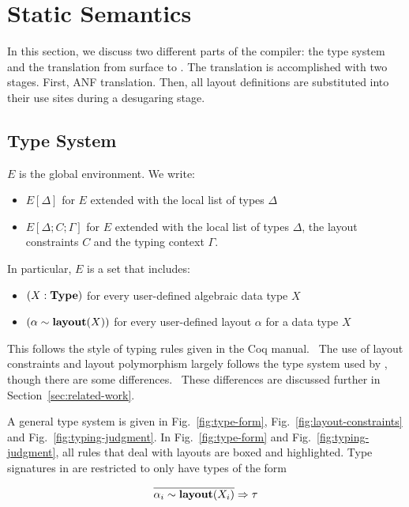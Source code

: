 \section{Static Semantics}

In this section, we discuss two different parts of the \Pika{} compiler: the type system and the translation
from surface \Pika{} to \PikaCore. The translation is accomplished with two stages. First, ANF translation. Then,
all layout definitions are substituted into their use sites during a desugaring stage.

\subsection{\Pika{} Type System}

$E$ is the global environment. We write:

\begin{itemize}
  \item $E[\Delta]$ for $E$ extended with the local list of types $\Delta$
  \item $E[\Delta;C;\Gamma]$ for $E$ extended with the local list of types $\Delta$, the
    layout constraints $C$ and the typing context $\Gamma$.
\end{itemize}

\noindent
In particular, $E$ is a set that includes:
\begin{itemize}
  \item $(X : \textbf{Type})$ for every user-defined algebraic data type $X$
  \item $(\alpha \sim \textbf{layout}(X))$ for every user-defined layout $\alpha$ for a data type $X$
\end{itemize}

\noindent
This follows the style of typing rules given in the Coq manual.~\cite{Coq-typing-rules} The use of layout constraints and layout
polymorphism largely follows the type system used by \Dargent, though there are some differences.~\cite{Dargent} These differences
are discussed further in Section~\ref{sec:related-work}.

A general type system is given in Fig.~\ref{fig:type-form}, Fig.~\ref{fig:layout-constraints} and Fig.~\ref{fig:typing-judgment}. In
Fig.~\ref{fig:type-form} and Fig.~\ref{fig:typing-judgment}, all rules that deal with layouts are boxed and highlighted. Type signatures
in \Pika{} are restricted to only have types of the form

\[
  \overline{\alpha_i \sim \textbf{layout}(X_i)} \Rightarrow \tau
\]

